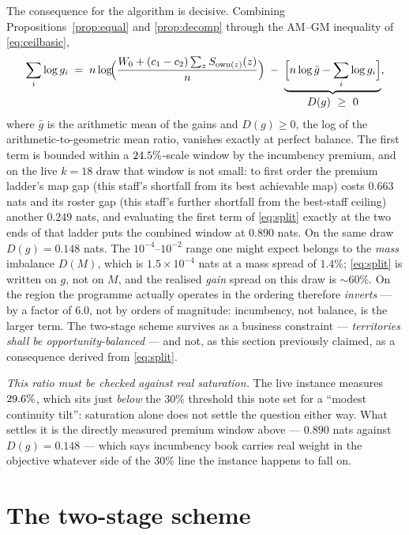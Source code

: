 \documentclass[11pt]{article}
\theoremstyle{definition}
\newcommand{\owner}{\operatorname{own}}
\begin{document}
The consequence for the algorithm is decisive. Combining
Propositions~\ref{prop:equal} and \ref{prop:decomp} through the AM--GM inequality of
\eqref{eq:ceilbasic},
\begin{equation}\label{eq:split}
\sum_i \log g_i
\;=\; n\log\!\Bigl(\frac{W_0 + (c_1-c_2)\sum_z S_{\owner(z)}(z)}{n}\Bigr)
\;-\;\underbrace{\Bigl[n\log \bar g - \sum_i \log g_i\Bigr]}_{\textstyle D(g)\ \ge\ 0},
\end{equation}
where $\bar g$ is the arithmetic mean of the gains and $D(g)\ge0$, the log of the
arithmetic-to-geometric mean ratio, vanishes exactly at perfect balance. The first term is
bounded within a $24.5\%$-scale window by the incumbency premium, and on the live
$k=18$ draw that window is not small: to first order the premium ladder's map gap (this
staff's shortfall from its best achievable map) costs $0.663$ nats and its roster gap (this
staff's further shortfall from the best-staff ceiling) another $0.249$ nats, and evaluating
the first term of \eqref{eq:split} exactly at the two ends of that ladder puts the combined
window at $0.890$ nats. On the same draw $D(g)=0.148$ nats. The $10^{-4}$--$10^{-2}$ range
one might expect belongs to the \emph{mass} imbalance $D(M)$, which is $1.5\times10^{-4}$
nats at a mass spread of $1.4\%$; \eqref{eq:split} is written on $g$, not on $M$, and the
realised \emph{gain} spread on this draw is ${\sim}60\%$. On the region the programme
actually operates in the ordering therefore \emph{inverts} --- by a factor of $6.0$, not by
orders of magnitude: incumbency, not balance, is the larger term. The two-stage scheme
survives as a business constraint --- \emph{territories shall be opportunity-balanced} ---
and not, as this section previously claimed, as a consequence derived from \eqref{eq:split}.

\emph{This ratio must be checked against real saturation.} The live instance measures
$29.6\%$, which sits just \emph{below} the $30\%$ threshold this note set for a ``modest
continuity tilt'': saturation alone does not settle the question either way. What settles it
is the directly measured premium window above --- $0.890$ nats against $D(g)=0.148$ --- which
says incumbency book carries real weight in the objective whatever side of the $30\%$ line
the instance happens to fall on.

\section{The two-stage scheme}\label{sec:stages}
\end{document}
